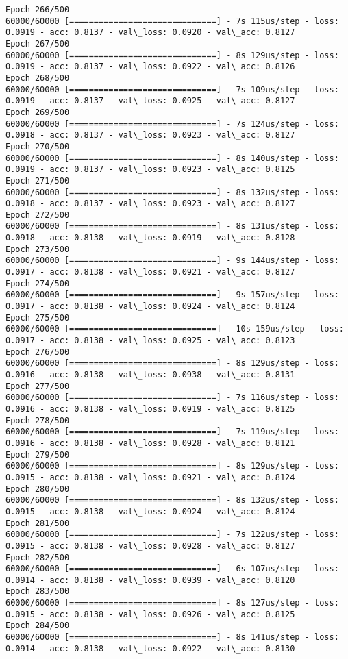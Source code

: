 \documentclass[11pt]{article}
\begin{document}
\begin{Verbatim}[commandchars=\\\{\}]
Epoch 266/500
60000/60000 [==============================] - 7s 115us/step - loss: 0.0919 - acc: 0.8137 - val\_loss: 0.0920 - val\_acc: 0.8127
Epoch 267/500
60000/60000 [==============================] - 8s 129us/step - loss: 0.0919 - acc: 0.8137 - val\_loss: 0.0922 - val\_acc: 0.8126
Epoch 268/500
60000/60000 [==============================] - 7s 109us/step - loss: 0.0919 - acc: 0.8137 - val\_loss: 0.0925 - val\_acc: 0.8127
Epoch 269/500
60000/60000 [==============================] - 7s 124us/step - loss: 0.0918 - acc: 0.8137 - val\_loss: 0.0923 - val\_acc: 0.8127
Epoch 270/500
60000/60000 [==============================] - 8s 140us/step - loss: 0.0919 - acc: 0.8137 - val\_loss: 0.0923 - val\_acc: 0.8125
Epoch 271/500
60000/60000 [==============================] - 8s 132us/step - loss: 0.0918 - acc: 0.8137 - val\_loss: 0.0923 - val\_acc: 0.8127
Epoch 272/500
60000/60000 [==============================] - 8s 131us/step - loss: 0.0918 - acc: 0.8138 - val\_loss: 0.0919 - val\_acc: 0.8128
Epoch 273/500
60000/60000 [==============================] - 9s 144us/step - loss: 0.0917 - acc: 0.8138 - val\_loss: 0.0921 - val\_acc: 0.8127
Epoch 274/500
60000/60000 [==============================] - 9s 157us/step - loss: 0.0917 - acc: 0.8138 - val\_loss: 0.0924 - val\_acc: 0.8124
Epoch 275/500
60000/60000 [==============================] - 10s 159us/step - loss: 0.0917 - acc: 0.8138 - val\_loss: 0.0925 - val\_acc: 0.8123
Epoch 276/500
60000/60000 [==============================] - 8s 129us/step - loss: 0.0916 - acc: 0.8138 - val\_loss: 0.0938 - val\_acc: 0.8131
Epoch 277/500
60000/60000 [==============================] - 7s 116us/step - loss: 0.0916 - acc: 0.8138 - val\_loss: 0.0919 - val\_acc: 0.8125
Epoch 278/500
60000/60000 [==============================] - 7s 119us/step - loss: 0.0916 - acc: 0.8138 - val\_loss: 0.0928 - val\_acc: 0.8121
Epoch 279/500
60000/60000 [==============================] - 8s 129us/step - loss: 0.0915 - acc: 0.8138 - val\_loss: 0.0921 - val\_acc: 0.8124
Epoch 280/500
60000/60000 [==============================] - 8s 132us/step - loss: 0.0915 - acc: 0.8138 - val\_loss: 0.0924 - val\_acc: 0.8124
Epoch 281/500
60000/60000 [==============================] - 7s 122us/step - loss: 0.0915 - acc: 0.8138 - val\_loss: 0.0928 - val\_acc: 0.8127
Epoch 282/500
60000/60000 [==============================] - 6s 107us/step - loss: 0.0914 - acc: 0.8138 - val\_loss: 0.0939 - val\_acc: 0.8120
Epoch 283/500
60000/60000 [==============================] - 8s 127us/step - loss: 0.0915 - acc: 0.8138 - val\_loss: 0.0926 - val\_acc: 0.8125
Epoch 284/500
60000/60000 [==============================] - 8s 141us/step - loss: 0.0914 - acc: 0.8138 - val\_loss: 0.0922 - val\_acc: 0.8130

\end{Verbatim}
\end{document}
